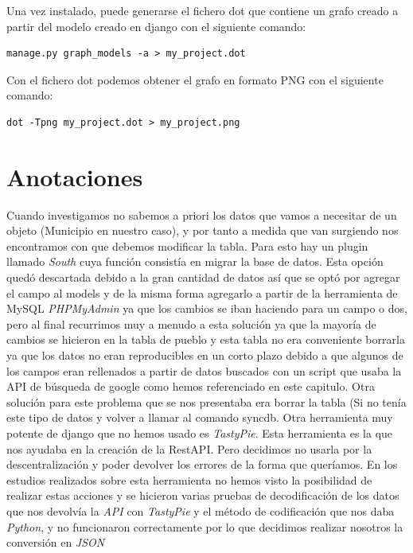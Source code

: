Una vez instalado, puede generarse el fichero dot que contiene un grafo creado a partir del modelo creado en django con el siguiente comando:

\begin{lstlisting}
manage.py graph_models -a > my_project.dot
\end{lstlisting}

Con el fichero dot podemos obtener el grafo en formato PNG con el siguiente comando:

\begin{lstlisting}
dot -Tpng my_project.dot > my_project.png
\end{lstlisting}

\section{Anotaciones}
	
Cuando investigamos no sabemos a priori los datos que vamos a necesitar de un objeto (Municipio en nuestro caso), y por tanto a medida que van surgiendo nos encontramos con que debemos modificar la tabla. Para esto hay un plugin llamado \textit{South} cuya función consistía en migrar la base de datos. Esta opción quedó descartada debido a la gran cantidad de datos así que se optó por agregar el campo al models y de la misma forma agregarlo a partir de la herramienta de MySQL \textit{PHPMyAdmin} ya que los cambios se iban haciendo para un campo o dos, pero al final recurrimos muy a menudo a esta solución ya que la mayoría de cambios se hicieron en la tabla de pueblo y esta tabla no era conveniente borrarla ya que los datos no eran reproducibles en un corto plazo debido a que algunos de los campos eran rellenados a partir de datos buscados con un script que usaba la API de búsqueda de google como hemos referenciado en este capitulo.
	Otra solución para este problema que se nos presentaba era borrar la tabla (Si no tenía este tipo de datos y volver a llamar al comando syncdb.
	Otra herramienta muy potente de django que no hemos usado es \textit{TastyPie}. Esta herramienta es la que nos ayudaba en la creación de la RestAPI. Pero decidimos no usarla por la descentralización y poder devolver los errores de la forma que queríamos. En los estudios realizados sobre esta herramienta no hemos visto la posibilidad de realizar estas acciones y se hicieron varias pruebas de decodificación de los datos que nos devolvía la \textit{API} con \textit{TastyPie} y el método de codificación que nos daba \textit{Python}, y no funcionaron correctamente por lo que decidimos realizar nosotros la conversión en \textit{JSON}

